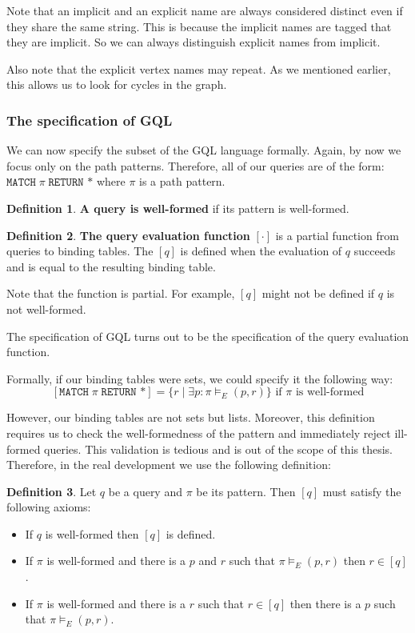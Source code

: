 \documentclass[14pt]{constructor-thesis}
\theoremstyle{definition}
\newtheorem*{definition}{Definition}
\begin{document}
Note that an implicit and an explicit name are always considered distinct even if they share the same string. This is because the implicit names are tagged that they are implicit. So we can always distinguish explicit names from implicit.

Also note that the explicit vertex names may repeat. As we mentioned earlier, this allows us to look for cycles in the graph.

\subsubsection{The specification of GQL}

We can now specify the subset of the GQL language formally.
Again, by now we focus only on the path patterns. Therefore, all of our queries are of the form: $\texttt{MATCH} \; \pi \; \texttt{RETURN *}$ where $\pi$ is a path pattern. 

\begin{definition}
  \textbf{A query is well-formed} if its pattern is well-formed.
\end{definition}

\begin{definition}
  \textbf{The query evaluation function} $[ \cdot ]$ is a partial function from queries to binding tables. The $[q]$ is defined when the evaluation of $q$ succeeds and is equal to the resulting binding table.
\end{definition}

Note that the function is partial. For example, $[q]$ might not be defined if $q$ is not well-formed.

The specification of GQL turns out to be the specification of the query evaluation function.

Formally, if our binding tables were sets, we could specify it the following way:
$$ [\texttt{MATCH} \; \pi \; \texttt{RETURN *}] = \{ r \mid \exists p : \pi \models_E (p, r) \} \text{ if $\pi$ is well-formed} $$

However, our binding tables are not sets but lists. Moreover, this definition requires us to check the well-formedness of the pattern and immediately reject ill-formed queries. This validation is tedious and is out of the scope of this thesis. Therefore, in the real development we use the following definition:

\begin{definition}
  Let $q$ be a query and $\pi$ be its pattern. Then $[q]$ must satisfy the following axioms:
  \begin{itemize}
    \item If $q$ is well-formed then $[q]$ is defined.
    \item If $\pi$ is well-formed and there is a $p$ and $r$ such that $\pi \models_E (p, r)$ then $r \in [q]$.
    \item If $\pi$ is well-formed and there is a $r$ such that $r \in [q]$ then there is a $p$ such that $\pi \models_E (p, r)$.
  \end{itemize}
\end{definition}
\end{document}
